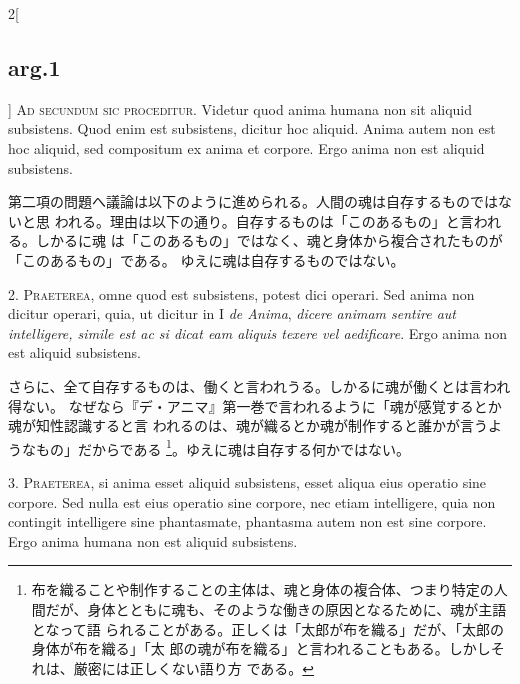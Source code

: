 \documentclass[paper=a4paper,fontsize=10pt,jafontsize=9pt,titlepage]{jlreq}
\begin{document}
\vspace{2em}
\begin{paracol}{2}[\subsection{arg.1}]
{\scshape Ad secundum sic proceditur}. Videtur quod anima humana non sit aliquid
subsistens. Quod enim est subsistens, dicitur hoc aliquid. Anima autem non est
hoc aliquid, sed compositum ex anima et corpore. Ergo anima non est aliquid
subsistens.

\switchcolumn

 第二項の問題へ議論は以下のように進められる。人間の魂は自存するものではないと思
 われる。理由は以下の通り。自存するものは「このあるもの」と言われる。しかるに魂
 は「このあるもの」ではなく、魂と身体から複合されたものが「このあるもの」である。
 ゆえに魂は自存するものではない。


2. {\scshape Praeterea}, omne quod est subsistens, potest dici operari. Sed
anima non dicitur operari, quia, ut dicitur in I {\itshape de Anima}, {\itshape
dicere animam sentire aut intelligere, simile est ac si dicat eam aliquis texere
vel aedificare}. Ergo anima non est aliquid subsistens.


\switchcolumn

 さらに、全て自存するものは、働くと言われうる。しかるに魂が働くとは言われ得ない。
 なぜなら『デ・アニマ』第一巻で言われるように「魂が感覚するとか魂が知性認識すると言
 われるのは、魂が織るとか魂が制作すると誰かが言うようなもの」だからである
 \footnote{布を織ることや制作することの主体は、魂と身体の複合体、つまり特定の人
 間だが、身体とともに魂も、そのような働きの原因となるために、魂が主語となって語
 られることがある。正しくは「太郎が布を織る」だが、「太郎の身体が布を織る」「太
 郎の魂が布を織る」と言われることもある。しかしそれは、厳密には正しくない語り方
 である。}。ゆえに魂は自存する何かではない。


3. {\scshape Praeterea}, si anima esset aliquid subsistens, esset aliqua eius
operatio sine corpore. Sed nulla est eius operatio sine corpore, nec etiam
intelligere, quia non contingit intelligere sine phantasmate, phantasma autem
non est sine corpore. Ergo anima humana non est aliquid subsistens.


\end{paracol}
\end{document}
